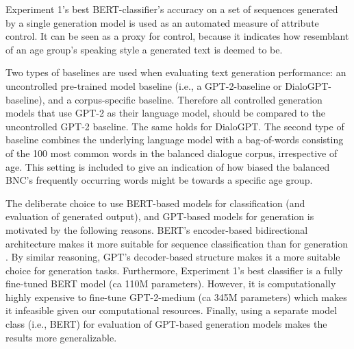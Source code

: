 Experiment 1's best BERT-classifier's accuracy on a set of sequences generated by a single generation model is used as an automated measure of attribute control. It can be seen as a proxy for control, because it indicates how resemblant of an age group's speaking style a generated text is deemed to be.

Two types of baselines are used when evaluating text generation performance: an uncontrolled pre-trained model baseline (i.e., a GPT-2-baseline or DialoGPT-baseline), and a corpus-specific baseline. 
Therefore all controlled generation models that use GPT-2 as their language model, should be compared to the uncontrolled GPT-2 baseline. The same holds for DialoGPT. The second type of baseline combines the underlying language model with a bag-of-words consisting of the 100 most common words in the balanced dialogue corpus, irrespective of age. This setting is included to give an indication of how biased the balanced BNC's frequently occurring words might be towards a specific age group.

The deliberate choice to use BERT-based models for classification (and evaluation of generated output), and GPT-based models for generation is motivated by the following reasons. BERT's encoder-based bidirectional architecture makes it more suitable for sequence classification than for generation \citep{devlin-etal-2019-bert}. By similar reasoning, GPT's decoder-based structure makes it a more suitable choice for generation tasks. Furthermore, Experiment 1's best classifier is a fully fine-tuned BERT model (ca 110M parameters). However, it is computationally highly expensive to fine-tune GPT-2-medium (ca 345M parameters) which makes it infeasible given our computational resources. Finally, using a separate model class (i.e., BERT) for evaluation of GPT-based generation models makes the results more generalizable.





